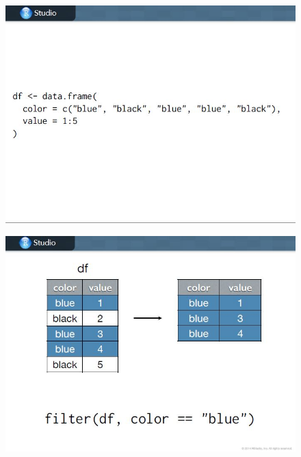 \documentclass{beamer}
\begin{document}
\begin{frame}
	\begin{figure}
		\centering
		\includegraphics[width=1.05\linewidth]{images/CG-dplyr8}
	\end{figure}
\end{frame}
\begin{frame}
	\begin{figure}
		\centering
		\includegraphics[width=1.05\linewidth]{images/CG-dplyr9}
	\end{figure}
\end{frame}
\end{document}

